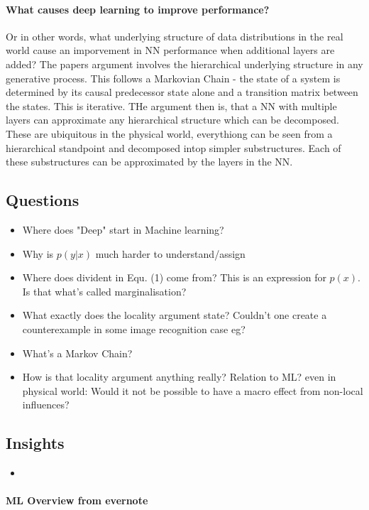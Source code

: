 \paragraph{What causes deep learning to improve performance?} Or in other words,
what underlying structure of data distributions in the real world cause an
imporvement in NN performance when additional layers are added?
The papers argument involves the hierarchical underlying structure in any
generative process. This follows a Markovian Chain - the state of a system is
determined by its causal predecessor state alone and a transition matrix between
the states. This is iterative.
THe argument then is, that a NN with multiple layers can approximate any
hierarchical structure which can be decomposed. These are ubiquitous in the
physical world, everythiong can be seen from a hierarchical standpoint and
decomposed intop simpler substructures. Each of these substructures can be
approximated by the layers in the NN.

\subsection{Questions}
\begin{itemize}
  \item Where does "Deep" start in Machine learning?
  \item Why is $p(y|x)$ much harder to understand/assign 
  \item Where does divident in Equ. (1) come from? This is an expression for
	$p(x)$. Is that what's called marginalisation?
  \item What exactly does the locality argument state? Couldn't one create a
	counterexample in some image recognition case eg?
  \item What's a Markov Chain?
  \item How is that locality argument anything really? Relation to ML? even in
	physical world: Would it not be possible to have a macro effect from
	non-local influences?
\end{itemize}
\subsection{Insights}
\begin{itemize}
  \item 
\end{itemize}

\paragraph{ML Overview from evernote}

